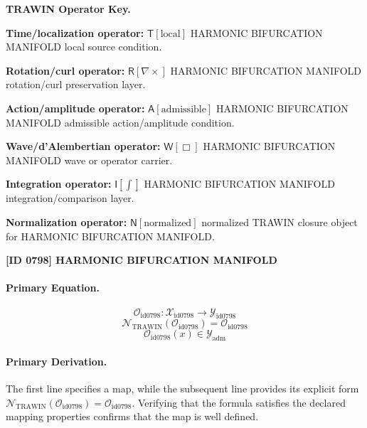 \par\vspace{0.45\baselineskip}
\noindent\begin{minipage}[t]{\linewidth}
\begingroup
\small
\raggedright
\textbf{TRAWIN Operator Key.}\par
\noindent\textbf{Time/localization operator:} $\mathsf{T}\!\left[\mathrm{local}\right]$ HARMONIC BIFURCATION MANIFOLD local source condition.\par
\noindent\textbf{Rotation/curl operator:} $\mathsf{R}\!\left[\nabla\times\right]$ HARMONIC BIFURCATION MANIFOLD rotation/curl preservation layer.\par
\noindent\textbf{Action/amplitude operator:} $\mathsf{A}\!\left[\mathrm{admissible}\right]$ HARMONIC BIFURCATION MANIFOLD admissible action/amplitude condition.\par
\noindent\textbf{Wave/d'Alembertian operator:} $\mathsf{W}\!\left[\Box\right]$ HARMONIC BIFURCATION MANIFOLD wave or operator carrier.\par
\noindent\textbf{Integration operator:} $\mathsf{I}\!\left[\int\right]$ HARMONIC BIFURCATION MANIFOLD integration/comparison layer.\par
\noindent\textbf{Normalization operator:} $\mathsf{N}\!\left[\mathrm{normalized}\right]$ normalized TRAWIN closure object for HARMONIC BIFURCATION MANIFOLD.\par
\endgroup
\end{minipage}

\clearpage
\noindent\textbf{[ID 0798] HARMONIC BIFURCATION MANIFOLD}\par
\vspace{0.35em}
\paragraph{Primary Equation.}
\[
\mathcal{O}_{\mathrm{id0798}}:\mathcal{X}_{\mathrm{id0798}}\longrightarrow\mathcal{Y}_{\mathrm{id0798}}
\]
\[
\mathcal{N}_{\mathrm{TRAWIN}}(\mathcal{O}_{\mathrm{id0798}})=\mathcal{O}_{\mathrm{id0798}}
\]
\[
\mathcal{O}_{\mathrm{id0798}}(x)\in\mathcal{Y}_{\mathrm{adm}}
\]

\paragraph{Primary Derivation.}
The first line specifies a map, while the subsequent line provides its explicit form \( \mathcal{N}_{\mathrm{TRAWIN}}(\mathcal{O}_{\mathrm{id0798}})=\mathcal{O}_{\mathrm{id0798}} \). Verifying that the formula satisfies the declared mapping properties confirms that the map is well defined.

